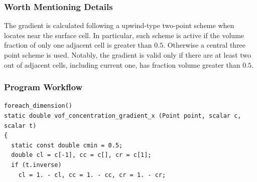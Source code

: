\documentclass[a4paper]{article}
\newcommand{\para}[1]{\textbf{\emph{\textcolor{para}{#1}}}}
\begin{document}
\subsubsection{Worth Mentioning Details}
The gradient is calculated following a upwind-type two-point scheme when locates near the surface cell. In particular, such scheme is active if the volume fraction of only one adjacent cell is greater than $0.5$. Otherwise a central three point scheme is used. Notably, the gradient is valid only if there are at least two out of adjacent cells, including current one, has fraction volume greater than $0.5$.
\subsubsection{Program Workflow}
\begin{multicols}{2}
 \columnbreak
 \begin{verbatim}
foreach_dimension()
static double vof_concentration_gradient_x (Point point, scalar c, scalar t)
{
  static const double cmin = 0.5;
  double cl = c[-1], cc = c[], cr = c[1];
  if (t.inverse)
    cl = 1. - cl, cc = 1. - cc, cr = 1. - cr;
 \end{verbatim}
\end{multicols}

\begin{center}
\end{center}
\end{document}
